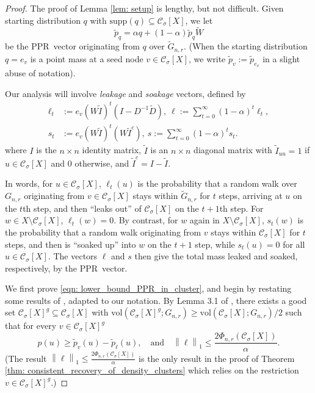 \documentclass{article}
\newcommand{\vol}{\mathrm{vol}}
\newcommand{\norm}[1]{\left\lVert#1\right\rVert}
\newcommand{\1}{\mathbf{1}}
\newcommand{\pbf}{p}        %
\newcommand{\Xbf}{X}             %
\newcommand{\Wbf}{W}
\newcommand{\Dbf}{D}
\newcommand{\Cset}{\mathcal{C}}
\newcommand{\Csig}{\Cset_{\sigma}}
\newcommand{\pprspace}{{\sc PPR~}}
\newcommand{\wDbf}{\widetilde{\Dbf}}
\theoremstyle{aldenthm}
\theoremstyle{aldenrmrk}
\begin{document}
\begin{proof}
	The proof of Lemma \ref{lem: setup} is lengthy, but not difficult. Given starting distribution $q$ with $\mathrm{supp}(q) \subseteq \Csig[\Xbf]$, we let
	\begin{equation}
	\widetilde{\pbf}_q = \alpha q + (1 - \alpha) \widetilde{\pbf}_{q} \widetilde{\Wbf}
	\end{equation}
	be the \pprspace vector originating from $q$ over $\widetilde{G}_{n,r}$. (When the starting distribution $q = e_v$ is a point mass at a seed node $v \in \Csig[\Xbf]$, we write $\widetilde{\pbf}_v := \widetilde{\pbf}_{e_v}$ in a slight abuse of notation).
	
	Our analysis will involve \emph{leakage} and \emph{soakage} vectors, defined by
	\begin{align}
	\label{eqn: leakage_soakage}
	\ell_t & := e_v (\Wbf \widetilde{I} )^t (I - \Dbf^{-1} \wDbf),~ \ell := \sum_{t = 0}^{\infty} (1 - \alpha)^t \ell_t, \nonumber \\
	s_t & := e_v (\Wbf \widetilde{I} )^t (\Wbf \widetilde{I}^c),~ s := \sum_{t = 0}^{\infty} (1 - \alpha)^{t} s_t.
	\end{align}
	where $I$ is the $n \times n$ identity matrix, $\widetilde{I}$ is an $n \times n$ diagonal matrix with $\widetilde{I}_{uu} = 1$ if $u \in \Csig[\Xbf]$ and $0$ otherwise, and $\widetilde{I}^c = I - \widetilde{I}$.
	
	In words, for $u \in \Csig[\Xbf]$, $\ell_t(u)$ is the probability that a random walk over $G_{n,r}$ originating from $v \in \Csig[\Xbf]$ stays within $\widetilde{G}_{n,r}$ for $t$ steps, arriving at $u$ on the $t$th step, and then ``leaks out'' of $\Csig[\Xbf]$ on the $t + 1$th step. For $w \in \Xbf \setminus \Csig[\Xbf]$, $\ell_t(w) = 0$. By contrast, for $w$ again in $\Xbf \setminus \Csig[\Xbf]$, $s_t(w)$ is the probability that a random walk originating from $v$ stays within $\Csig[\Xbf]$ for $t$ steps, and then is ``soaked up'' into $w$ on the $t + 1$ step, while $s_t(u) = 0$ for all $u \in \Csig[\Xbf]$. The vectors $\ell$ and $s$ then give the total mass leaked and soaked, respectively, by the \pprspace vector. 
	
	We first prove \eqref{eqn: lower_bound_PPR_in_cluster}, and begin by restating some results of \citep{zhu2013}, adapted to our notation. By Lemma 3.1 of \citep{zhu2013}, there exists a good set $\Csig[\Xbf]^g \subseteq \Csig[\Xbf]$ with $\vol(\Csig[\Xbf]^g; G_{n,r}) \geq \vol(\Csig[\Xbf]; G_{n,r})/2$ such that for every $v \in \Csig[\Xbf]^g$
	\begin{equation}
	\label{eqn: zhulemma3.1}
	\pbf(u) \geq \widetilde{\pbf}_v(u) - \widetilde{\pbf}_{\ell}(u), \quad \textrm{and} \quad \norm{\ell}_1 \leq \frac{2 \Phi_{n,r}(\Csig[\Xbf])}{\alpha}.
	\end{equation}
	(The result $\norm{\ell}_1 \leq \frac{2 \Phi_{n,r}(\Csig[\Xbf])}{\alpha}$ is the only result in the proof of Theorem \ref{thm: consistent_recovery_of_density_clusters} which relies on the restriction $v \in \Csig[\Xbf]^g$.)
	

\end{proof}
\end{document}
